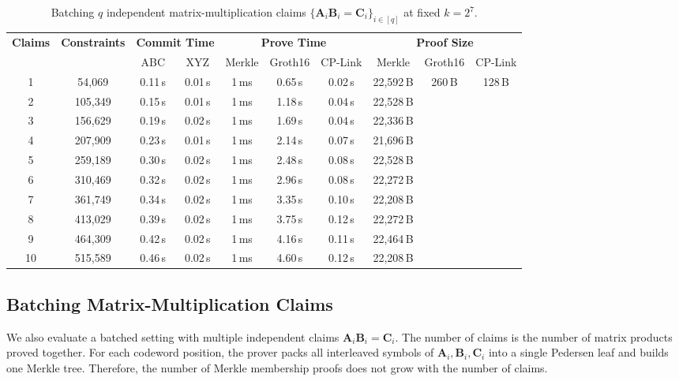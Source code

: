 \documentclass[conference,compsoc]{IEEEtran}
\newcommand{\mat}{\mathbf}          %
\theoremstyle{plain}
\theoremstyle{definition}
\theoremstyle{remark}
\begin{document}
\begin{table}[!t]
\centering
\scriptsize
\setlength{\tabcolsep}{2.4pt}
\begin{adjustbox}{max width=\textwidth}
\begin{tabular}{c c cc ccc ccc}
\toprule
\multirow{2}{*}{\textbf{Claims}}
& \multirow{2}{*}{\textbf{Constraints}}
& \multicolumn{2}{c}{\textbf{Commit Time}}
& \multicolumn{3}{c}{\textbf{Prove Time}}
& \multicolumn{3}{c}{\textbf{Proof Size}} \\
\cmidrule(lr){3-4}\cmidrule(lr){5-7}\cmidrule(lr){8-10}
& & ABC & XYZ
& Merkle & Groth16 & CP-Link
& Merkle & Groth16 & CP-Link \\
\midrule
1  & 54{,}069  & 0.11\,s & 0.01\,s & 1\,ms & 0.65\,s & 0.02\,s & 22{,}592\,B & \multirow{10}{*}{260\,B} & \multirow{10}{*}{128\,B} \\
2  & 105{,}349 & 0.15\,s & 0.01\,s & 1\,ms & 1.18\,s & 0.04\,s & 22{,}528\,B & & \\
3  & 156{,}629 & 0.19\,s & 0.02\,s & 1\,ms & 1.69\,s & 0.04\,s & 22{,}336\,B & & \\
4  & 207{,}909 & 0.23\,s & 0.01\,s & 1\,ms & 2.14\,s & 0.07\,s & 21{,}696\,B & & \\
5  & 259{,}189 & 0.30\,s & 0.02\,s & 1\,ms & 2.48\,s & 0.08\,s & 22{,}528\,B & & \\
6  & 310{,}469 & 0.32\,s & 0.02\,s & 1\,ms & 2.96\,s & 0.08\,s & 22{,}272\,B & & \\
7  & 361{,}749 & 0.34\,s & 0.02\,s & 1\,ms & 3.35\,s & 0.10\,s & 22{,}208\,B & & \\
8  & 413{,}029 & 0.39\,s & 0.02\,s & 1\,ms & 3.75\,s & 0.12\,s & 22{,}272\,B & & \\
9  & 464{,}309 & 0.42\,s & 0.02\,s & 1\,ms & 4.16\,s & 0.11\,s & 22{,}464\,B & & \\
10 & 515{,}589 & 0.46\,s & 0.02\,s & 1\,ms & 4.60\,s & 0.12\,s & 22{,}208\,B & & \\
\bottomrule
\end{tabular}
\end{adjustbox}
\vspace{6pt}
\caption{Batching \(q\) independent matrix-multiplication claims
\(\{\mat{A}_i\mat{B}_i=\mat{C}_i\}_{i\in[q]}\) at fixed \(k=2^7\).}
\label{tab:lamp-batch}
\end{table}

\subsection{Batching Matrix-Multiplication Claims}
\label{sec:eval-batch}
We also evaluate a batched setting with multiple independent claims \(\mat{A}_i\mat{B}_i=\mat{C}_i\).  The number of claims is the number of matrix products proved together.  For each codeword position, the prover packs all interleaved symbols of \(\mat{A}_i,\mat{B}_i,\mat{C}_i\) into a single Pedersen leaf and builds one Merkle tree.  Therefore, the number of Merkle membership proofs does not grow with the number of claims.
\end{document}
